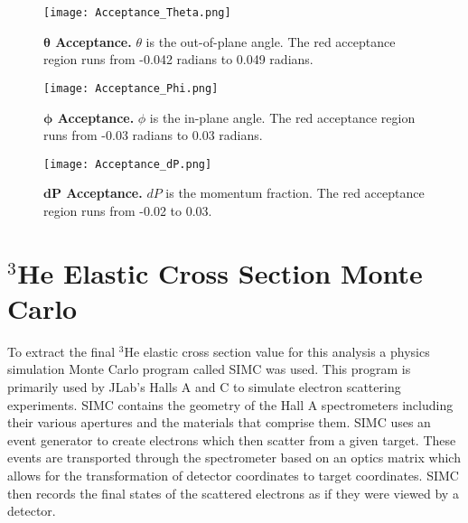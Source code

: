 \begin{figure}[!ht]
\begin{center}
\texttt{[image: Acceptance\_Theta.png]}
\end{center}
\caption[$\theta$ Acceptance]{
{\bf{$\boldsymbol{\theta}$ Acceptance.}} $\theta$ is the out-of-plane angle. The red acceptance region runs from -0.042 radians to 0.049 radians.}
\label{fig:acceptance_th}
\end{figure}

\begin{figure}[!ht]
\begin{center}
\texttt{[image: Acceptance\_Phi.png]}
\end{center}
\caption[$\phi$ Acceptance]{
{\bf{$\boldsymbol{\phi}$ Acceptance.}} $\phi$ is the in-plane angle. The red acceptance region runs from -0.03 radians to 0.03 radians.}
\label{fig:acceptance_ph}
\end{figure}

\begin{figure}[!ht]
\begin{center}
\texttt{[image: Acceptance\_dP.png]}
\end{center}
\caption[$dP$ Acceptance]{
{\bf{$\boldsymbol{dP}$ Acceptance.}} $dP$ is the momentum fraction. The red acceptance region runs from -0.02 to 0.03.}
\label{fig:acceptance_dp}
\end{figure}

\section{$^3$He Elastic Cross Section Monte Carlo}
\label{sec:simc}

To extract the final $^3$He elastic cross section value for this analysis a physics simulation Monte Carlo program called SIMC was used. This program is primarily used by JLab's Halls A and C to simulate electron scattering experiments. SIMC contains the geometry of the Hall A spectrometers including their various apertures and the materials that comprise them. SIMC uses an event generator to create electrons which then scatter from a given target. These events are transported through the spectrometer based on an optics matrix which allows for the transformation of detector coordinates to target coordinates. SIMC then records the final states of the scattered electrons as if they were viewed by a detector.

